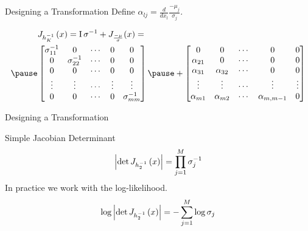 \documentclass[14pt]{beamer}
\begin{document}
\begin{frame}{Designing a Transformation}
Define $ \alpha_{lj} = \frac{d}{dx_{l}}\frac{-\mu_{j}}{\sigma_{j}} $.
\begin{small}
\begin{equation*}
\begin{aligned}
&\jacob{h_{K}^{-1}}{x} = \IMatrix\sigma^{-1} + J_{\frac{-\mu}{\sigma}}(x) = \\ \pause
&\begin{bmatrix}
\sigma^{-1}_{11} & 0 & \cdots & 0 & 0 \\
0 & \sigma^{-1}_{22} & \cdots & 0 & 0 \\
0 & 0 & \cdots & 0 & 0 \\
\vdots & \vdots & \cdots & \vdots & \vdots \\
0 & 0 & \cdots & 0 & \sigma^{-1}_{mm}
\end{bmatrix}
\pause
+
\begin{bmatrix}
0 & 0 & \cdots & 0 & 0 \\
\alpha_{21} & 0 & \cdots & 0 & 0 \\
\alpha_{31} & \alpha_{32} & \cdots & 0 & 0 \\
\vdots & \vdots & \cdots & \vdots & \vdots \\
\alpha_{m1} & \alpha_{m2} & \cdots & \alpha_{m,m-1} & 0
\end{bmatrix}
\end{aligned}
\end{equation*}
\end{small}
\end{frame}

\begin{frame}{Designing a Transformation}
\begin{block}{Simple Jacobian Determinant}
\begin{equation*}
\left|\det J_{h_{2}^{-1}}\left(x\right)\right| = \prod_{j=1}^{M}\sigma^{-1}_{j}
\end{equation*}
\pause
In practice we work with the log-likelihood.
\begin{equation*}
\log\left|\det J_{h_{2}^{-1}}\left(x\right)\right| = -\sum_{j=1}^{M}\log\sigma_{j}
\end{equation*}
\end{block}
\end{frame}
\end{document}
